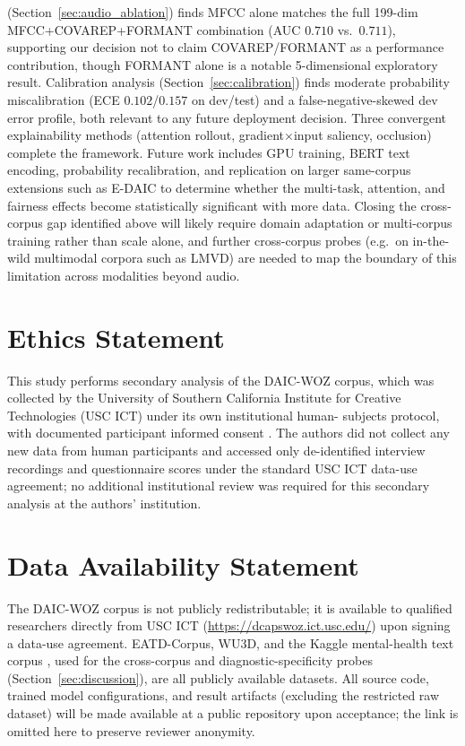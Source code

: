 \documentclass[5p,twocolumn]{elsarticle}
\begin{document}
(Section~\ref{sec:audio_ablation}) finds MFCC alone matches the full
199-dim MFCC+COVAREP+FORMANT combination (AUC $0.710$ vs.\ $0.711$),
supporting our decision not to claim COVAREP/FORMANT as a performance
contribution, though FORMANT alone is a notable 5-dimensional
exploratory result. Calibration analysis
(Section~\ref{sec:calibration}) finds moderate probability
miscalibration (ECE $0.102$/$0.157$ on dev/test) and a
false-negative-skewed dev error profile, both relevant to any future
deployment decision. Three convergent explainability methods
(attention rollout, gradient$\times$input saliency, occlusion)
complete the framework. Future work includes GPU training, BERT text
encoding, probability recalibration, and replication on larger
same-corpus extensions such as E-DAIC to determine whether the
multi-task, attention, and fairness effects become statistically
significant with more data. Closing the cross-corpus gap identified
above will likely require domain adaptation or multi-corpus training
rather than scale alone, and further cross-corpus probes (e.g.\ on
in-the-wild multimodal corpora such as LMVD) are needed to map the
boundary of this limitation across modalities beyond audio.

\section*{Ethics Statement}
This study performs secondary analysis of the DAIC-WOZ corpus, which
was collected by the University of Southern California Institute for
Creative Technologies (USC ICT) under its own institutional human-
subjects protocol, with documented participant informed consent
\cite{gratch2014}. The authors did not collect any new data from human
participants and accessed only de-identified interview recordings and
questionnaire scores under the standard USC ICT data-use agreement;
no additional institutional review was required for this secondary
analysis at the authors' institution.

\section*{Data Availability Statement}
The DAIC-WOZ corpus is not publicly redistributable; it is available
to qualified researchers directly from USC ICT
(\url{https://dcapswoz.ict.usc.edu/}) upon signing a data-use
agreement. EATD-Corpus, WU3D, and the Kaggle mental-health text corpus
\cite{sarkar2022mentalhealth}, used for the cross-corpus and
diagnostic-specificity probes (Section~\ref{sec:discussion}), are all
publicly available datasets. All source code, trained model
configurations, and result artifacts (excluding the restricted raw
dataset) will be made available at a public repository upon
acceptance; the link is omitted here to preserve reviewer anonymity.
\end{document}
